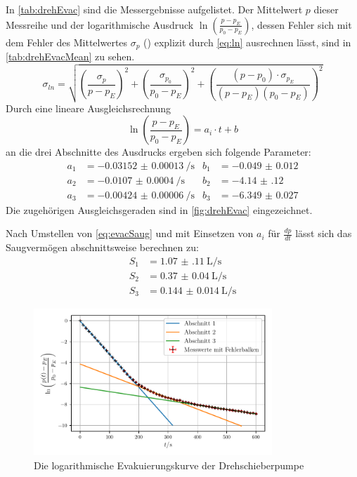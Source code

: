     In \autoref{tab:drehEvac} sind die Messergebnisse aufgelistet. Der Mittelwert $p$ dieser Messreihe und der logarithmische Ausdruck
    $\ln\left(\frac{p-p_E}{p_0-p_E}\right)$, dessen Fehler sich mit dem Fehler des Mittelwertes $\sigma_p$ () explizit durch \autoref{eq:ln} ausrechnen lässt, sind in \autoref{tab:drehEvacMean} zu sehen.
    \begin{equation}
        \sigma_{ln} = \sqrt{\left(\frac{\sigma_p}{p-p_E}\right)^2+\left(\frac{\sigma_{p_0}}{p_0-p_E}\right)^2+\left(\frac{(p-p_0)\cdot\sigma_{p_E}}{(p-p_E)(p_0-p_E)}\right)^2}
        \label{eq:ln}
    \end{equation}
    Durch eine lineare Ausgleichsrechnung 
    \begin{equation*}
        \ln\left(\frac{p-p_E}{p_0-p_E}\right) = a_i \cdot t + b
    \end{equation*}
    an die drei Abschnitte des Ausdrucks ergeben sich folgende Parameter:
    \begin{align*}
        a_1 &= \qty{-0.03152(13)}{\per\second} & b_1 &= \num{-0.049(12)} \\
        a_2 &= \qty{-0.0107(4)}{\per\second} & b_2 &= \num{-4.14(12)} \\
        a_3 &= \qty{-0.00424(6)}{\per\second} & b_3 &= \num{-6.349(27)}
    \end{align*}
    Die zugehörigen Ausgleichsgeraden sind in \autoref{fig:drehEvac} eingezeichnet.

    Nach Umstellen von \autoref{eq:evacSaug} und mit Einsetzen von $a_i$ für $\frac{dp}{dt}$
    lässt sich das Saugvermögen abschnittsweise berechnen zu:
    \begin{align*}
        S_1 &= \qty{1.07(11)}{\liter\per\second} \\
        S_2 &= \qty{0.37(4)}{\liter\per\second} \\
        S_3 &= \qty{0.144(14)}{\liter\per\second} 
    \end{align*}

    \begin{figure}
        \centering
        \includegraphics[width=0.8\textwidth]{abb/dreh_evac.pdf}
        \caption{Die logarithmische Evakuierungskurve der Drehschieberpumpe}
        \label{fig:drehEvac}
    \end{figure}

